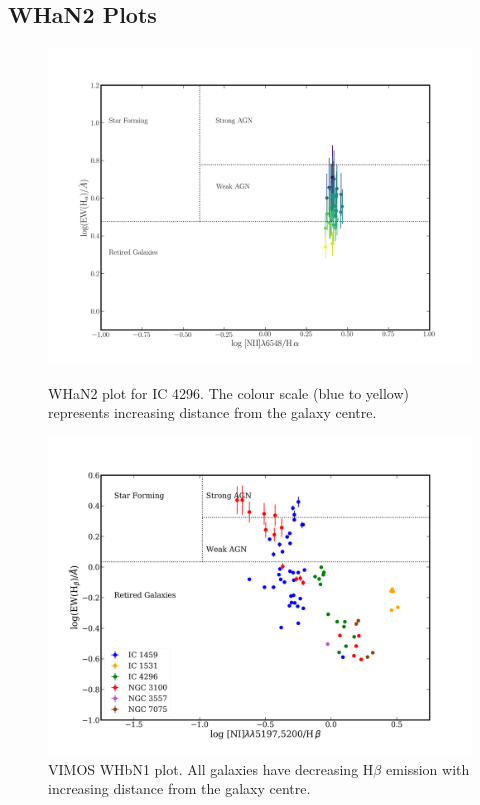 	\subsection{WHaN2 Plots}
		\label{subsec:WHaN2}
		\begin{figure}[t]
			\centering
			\includegraphics[height=.43\textheight]{chapter5/WHaN2.png}
			\caption[WHaN2 plot for IC 4296]{WHaN2 plot for IC 4296. The colour scale (blue to yellow) represents increasing distance from the galaxy centre.}
			\label{fig:WHaN2}

			\includegraphics[height=.43\textheight]{chapter5/WHbN1.png}
			\caption[VIMOS WHbN1 plot]{VIMOS WHbN1 plot. All galaxies have decreasing H$\beta$ emission with increasing distance from the galaxy centre.}
			\label{fig:WHbN1}
		\end{figure}

